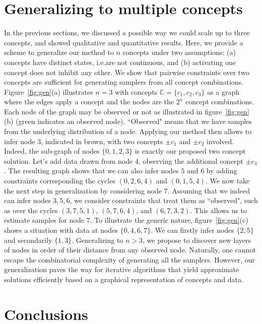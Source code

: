 \documentclass[10pt,twocolumn,letterpaper]{article}
\begin{document}
\section{Generalizing to multiple concepts}
In the previous sections, we discussed a possible way we could scale up to three concepts, and showed qualitative and quantitative results. Here, we provide a scheme to generalize our method to $n$ concepts under two assumptions: (a) concepts have distinct states, i.e.\they are not continuous, and (b) activating one concept does not inhibit any other. We show that pairwise constraints over two concepts are sufficient for generating samplers from all concept combinations. Figure~\ref{fig:gen}(a) illustrates $n=3$ with concepts $\mathbb{C}=\{c_1, c_2, c_3\}$ as a graph where the edges apply a concept and the nodes are the $2^n$ concept combinations. Each node of the graph may be observed or not as illustrated in figure~\ref{fig:gen}(b) (green indicates an observed node). ``Observed" means that we have samples from the underlying distribution of a node. Applying our method then allows to infer node $3$, indicated in brown, with two concepts $\pm c_1$ and $\pm c_2$ involved. Indeed, the sub-graph of nodes $\{0,1,2,3\}$ is exactly our proposed two concept solution. Let's add data drawn from node $4$, observing the additional concept $\pm c_3$. The resulting graph shows that we can also infer nodes $5$ and $6$ by adding constraints corresponding the cycles $(0,2,6,4)$ and $(0,1,5,4)$. We now take the next step in generalization by considering node $7$. Assuming that we indeed can infer nodes ${3,5,6}$, we consider constraints that treat them as ``observed", such as over the cycles $(3,7,5,1)$, $(5,7,6,4)$, and $(6,7,3,2)$. This allows us to estimate samples for node $7$. To illustrate the generic nature, figure~\ref{fig:gen}(c) shows a situation with data at nodes $\{0,4,6,7\}$. We can firstly infer nodes $\{2,5\}$ and secondarily $\{1,3\}$. Generalizing to $n>3$, we propose to discover new layers of nodes in order of their distance from any observed node. Naturally, one cannot escape the combinatorial complexity of generating all the samplers. However, our generalization paves the way for iterative algorithms that yield approximate solutions efficiently based on a graphical representation of concepts and data.

\section{Conclusions}
\end{document}
